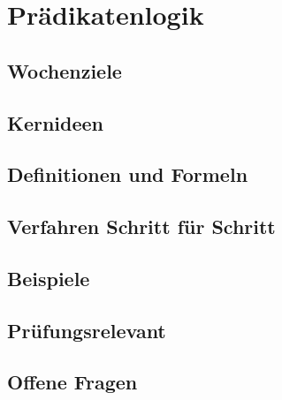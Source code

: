 \chapter{Prädikatenlogik}
\label{kap:03-praedikatenlogik}

\section*{Wochenziele}
\begin{wochenziele}
\end{wochenziele}

\section{Kernideen}

\section{Definitionen und Formeln}

\section{Verfahren Schritt für Schritt}

\section{Beispiele}

\section{Prüfungsrelevant}

\section{Offene Fragen}
